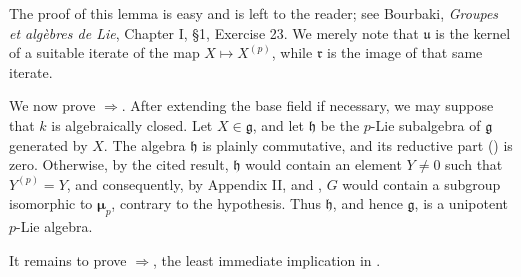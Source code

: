 
The proof of this lemma is easy and is left to the reader; see
Bourbaki, \emph{Groupes et algèbres de Lie}, Chapter I, \S1,
Exercise 23.  We merely note that \(\mathfrak u\) is the kernel of
a suitable iterate of the map \(X\mapsto X^{(p)}\), while
\(\mathfrak r\) is the image of that same iterate.

We now prove \(\Rightarrow\).  After extending the base
field if necessary, we may suppose that \(k\) is algebraically
closed.  Let \(X\in\mathfrak g\), and let \(\mathfrak h\) be the
\(p\)-Lie subalgebra of \(\mathfrak g\) generated by \(X\).  The
algebra \(\mathfrak h\) is plainly commutative, and its reductive
part () is zero.  Otherwise, by the cited result,
\(\mathfrak h\) would contain an element \(Y\ne0\) such that
\(Y^{(p)}=Y\), and consequently, by Appendix II,  and ,
\(G\) would contain a subgroup isomorphic to
\(\boldsymbol\mu_p\), contrary to the hypothesis.  Thus
\(\mathfrak h\), and hence \(\mathfrak g\), is a unipotent
\(p\)-Lie algebra.

It remains to prove \(\Rightarrow\), the least immediate
implication in .

